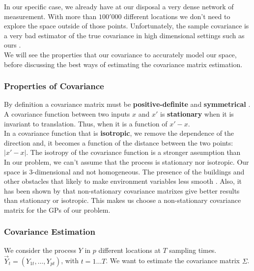 In our specific case, we already have at our disposal a very dense network of measurement. With more than $100'000$ different locations we don't need to explore the space outside of those points. Unfortunately, the sample covariance is a very bad estimator of the true covariance in high dimensional settings such as ours \citep{pourahmadi_covariance_2011}. \\


We will see the properties that our covariance to accurately model our space, before discussing the best ways of estimating the covariance matrix estimation.


\subsubsection{Properties of Covariance}

By definition a covariance matrix must be \textbf{positive-definite} and \textbf{symmetrical} \citep[p.~80]{rasmussen_gaussian_2006}. \\

A covariance function between two inputs $x$ and $x'$ is \textbf{stationary}   when it is invariant to translation. Thus, when it is a function of $x' - x$. \\
In a covariance function that is \textbf{isotropic}, we remove the dependence of the direction and, it becomes a function of the distance between the two points: $|x' - x|$. The isotropy of the covariance function is a stronger assumption than  \\ 

In our problem, we can't assume that the process is stationary nor isotropic. Our space is 3-dimensional and not homogeneous. The presence of the buildings and other obstacles that likely to make environment variables less smooth \citep{paciorek_nonstationary_2004}. Also, it has been shown by \citet{krause_near-optimal_2008} that non-stationary covariance matrixes give better results than stationary or isotropic. This makes us choose a non-stationary covariance matrix for the  GPs of our problem.


\subsubsection{Covariance Estimation}

We consider the process $Y$ in $p$ different locations at $T$ sampling times. $\vec{Y}_t = (Y_{1t}, \dots, Y_{pt})$, with $t = 1 \dots T$. We want to estimate the covariance matrix $\Sigma$. \\

